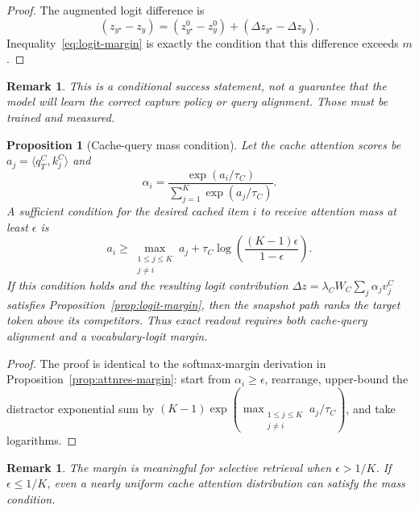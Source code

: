 \documentclass[11pt]{article}
\newtheorem{proposition}[theorem]{Proposition}
\newtheorem{remark}[theorem]{Remark}
\begin{document}
\begin{proof}
The augmented logit difference is
\begin{equation}
(z_{y^\star}-z_y)
= (z^0_{y^\star}-z^0_y) + (\Delta z_{y^\star}-\Delta z_y).
\end{equation}
Inequality~\eqref{eq:logit-margin} is exactly the condition that this difference exceeds $m$.
\end{proof}

\begin{remark}
This is a conditional success statement, not a guarantee that the model will learn the correct capture policy or query alignment. Those must be trained and measured.
\end{remark}

\begin{proposition}[Cache-query mass condition]
\label{prop:cache-mass}
Let the cache attention scores be $a_j=\langle q_T^C,k_j^C\rangle$ and
\begin{equation}
\alpha_i=\frac{\exp(a_i/\tau_C)}{\sum_{j=1}^{K}\exp(a_j/\tau_C)}.
\end{equation}
A sufficient condition for the desired cached item $i$ to receive attention mass at least $\epsilon$ is
\begin{equation}
\label{eq:cache-mass-margin}
a_i\geq \max_{\substack{1\le j\le K\\ j\ne i}}a_j+\tau_C\log\left(\frac{(K-1)\epsilon}{1-\epsilon}\right).
\end{equation}
If this condition holds and the resulting logit contribution $\Delta z=\lambda_CW_C\sum_j\alpha_jv_j^C$ satisfies Proposition~\ref{prop:logit-margin}, then the snapshot path ranks the target token above its competitors. Thus exact readout requires both cache-query alignment and a vocabulary-logit margin.
\end{proposition}

\begin{proof}
The proof is identical to the softmax-margin derivation in Proposition~\ref{prop:attnres-margin}: start from $\alpha_i\geq\epsilon$, rearrange, upper-bound the distractor exponential sum by $(K-1)\exp(\max_{\substack{1\le j\le K\\ j\ne i}}a_j/\tau_C)$, and take logarithms.
\end{proof}

\begin{remark}
The margin is meaningful for selective retrieval when $\epsilon>1/K$. If $\epsilon\leq 1/K$, even a nearly uniform cache attention distribution can satisfy the mass condition.
\end{remark}
\end{document}
